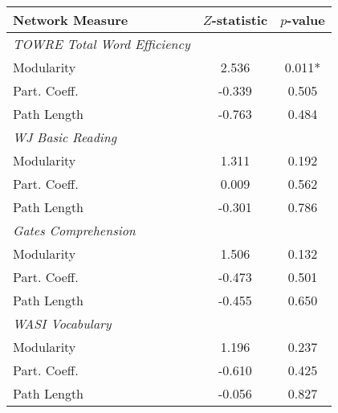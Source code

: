 \begin{tabular}{lcc}
\toprule
Network Measure   &  $Z$-statistic &  $p$-value \\
\midrule
\textit{TOWRE Total Word Efficiency} & & \\
    \hspace{5pt}Modularity &  2.536 &  0.011* \\
    \hspace{5pt}Part. Coeff. & -0.339 &  0.505 \\
    \hspace{5pt}Path Length & -0.763 &  0.484 \\
\textit{WJ Basic Reading} & & \\
    \hspace{5pt}Modularity &  1.311 &  0.192 \\
    \hspace{5pt}Part. Coeff. &  0.009 &  0.562 \\
    \hspace{5pt}Path Length & -0.301 &  0.786 \\
\textit{Gates Comprehension}  & & \\
    \hspace{5pt}Modularity &  1.506 &  0.132 \\
    \hspace{5pt}Part. Coeff. & -0.473 &  0.501 \\
    \hspace{5pt}Path Length & -0.455 &  0.650 \\
\textit{WASI Vocabulary}  & & \\
    \hspace{5pt}Modularity &  1.196 &  0.237 \\
    \hspace{5pt}Part. Coeff. & -0.610 &  0.425 \\
    \hspace{5pt}Path Length & -0.056 &  0.827 \\
\bottomrule
\end{tabular}